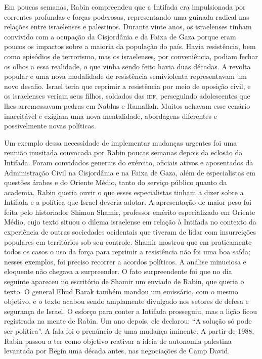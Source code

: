 Em poucas semanas, Rabin compreendeu que a Intifada era impulsionada por
correntes profundas e forças poderosas, representando uma guinada
radical nas relações entre israelenses e palestinos. Durante vinte anos,
os israelenses tinham convivido com a ocupação da Cisjordânia e da Faixa
de Gaza porque eram poucos os impactos sobre a maioria da população do
país. Havia resistência, bem como episódios de terrorismo, mas os
israelenses, por conveniência, podiam fechar os olhos a essa realidade,
o que vinha sendo feito havia duas décadas. A revolta popular e uma nova
modalidade de resistência semiviolenta representavam um novo desafio.
Israel teria que reprimir a resistência por meio de oposição civil, e os
israelenses veriam seus filhos, soldados das \textsc{idf}, perseguindo
adolescentes que lhes arremessavam pedras em Nablus e Ramallah. Muitos
achavam esse cenário inaceitável e exigiam uma nova mentalidade,
abordagens diferentes e possivelmente novas políticas.

Um exemplo dessa necessidade de implementar mudanças urgentes foi uma
reunião inusitada convocada por Rabin poucas semanas depois da eclosão
da Intifada. Foram convidados generais do exército, oficiais ativos e
aposentados da Administração Civil na Cisjordânia e na Faixa de Gaza,
além de especialistas em questões árabes e do Oriente Médio, tanto do
serviço público quanto da academia. Rabin queria ouvir o que esses
especialistas tinham a dizer sobre a Intifada e a política que Israel
deveria adotar. A apresentação de maior peso foi feita pelo historiador
Shimon Shamir, professor emérito especializado em Oriente Médio, cujo
texto situou o dilema israelense em relação à Intifada no contexto da
experiência de outras sociedades ocidentais que tiveram de lidar com
insurreições populares em territórios sob seu controle. Shamir mostrou
que em praticamente todos os casos o uso da força para reprimir a
resistência não foi uma boa saída; nesses exemplos, foi preciso recorrer
a acordos políticos. A análise minuciosa e eloquente não chegava a
surpreender. O fato surpreendente foi que no dia seguinte apareceu no
escritório de Shamir um enviado de Rabin, que queria o texto. O general
Ehud Barak também mandou um emissário, com o mesmo objetivo, e o texto
acabou sendo amplamente divulgado nos setores de defesa e segurança de
Israel. O esforço para conter a Intifada prosseguiu, mas a lição ficou
registrada na mente de Rabin. Um ano depois, ele declarou: ``A solução
só pode ser política''. A fala foi o prenúncio de uma mudança iminente.
A partir de 1988, Rabin passou a ter como objetivo reativar a ideia de
autonomia palestina levantada por Begin uma década antes, nas
negociações de Camp David.

